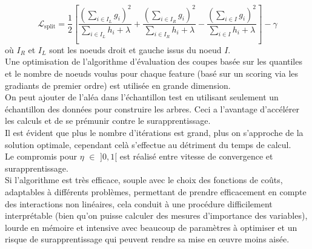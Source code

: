 \documentclass[french]{article}
\begin{document}
\begin{multicols}{2}
$$
\mathcal{L}_{\text {split}}=\frac{1}{2}\left[\frac{\displaystyle\left(\sum_{i \in I_{L}} g_{i}\right)^{2}}{\displaystyle\sum_{i \in I_{L}} h_{i}+\lambda}+\frac{\displaystyle\left(\sum_{i \in I_{R}} g_{i}\right)^{2}}{\displaystyle\sum_{i \in I_{R}} h_{i}+\lambda}-\frac{\displaystyle\left(\sum_{i \in I} g_{i}\right)^{2}}{\displaystyle\sum_{i \in I} h_{i}+\lambda}\right]-\gamma
$$
où $I_{R}$ et $I_{L}$ sont les noeuds droit et gauche issus du noeud $I$.\\
Une optimisation de l'algorithme d'évaluation des coupes basée sur les quantiles et le nombre de noeuds voulus pour chaque feature (basé sur un scoring via les gradiants de premier ordre) est utilisée en grande dimension.\\
On peut ajouter de l'aléa dans l'échantillon test en utilisant seulement un échantillon des données pour construire les arbres. Ceci a l'avantage d'accélérer les calculs et de se prémunir contre le surapprentissage.\\
Il est évident que plus le nombre d'itérations est grand, plus on s'approche de la solution optimale, cependant celà s'effectue au détriment du temps de calcul.\\
Le compromis pour $\eta$ $\in$ $]0,1[ $ est réalisé entre vitesse de convergence et surapprentissage.\\
Si l'algorithme est très efficace, souple avec le choix des fonctions de coûts,
adaptables à différents problèmes, permettant de prendre efficacement en compte des interactions non linéaires, cela conduit à une procédure difficilement interprétable (bien qu'on puisse calculer des mesures d'importance des variables), lourde en mémoire et intensive avec beaucoup de paramètres à optimiser et un risque de surapprentissage qui peuvent rendre sa mise en œuvre moins aisée.


\end{multicols}
\end{document}
